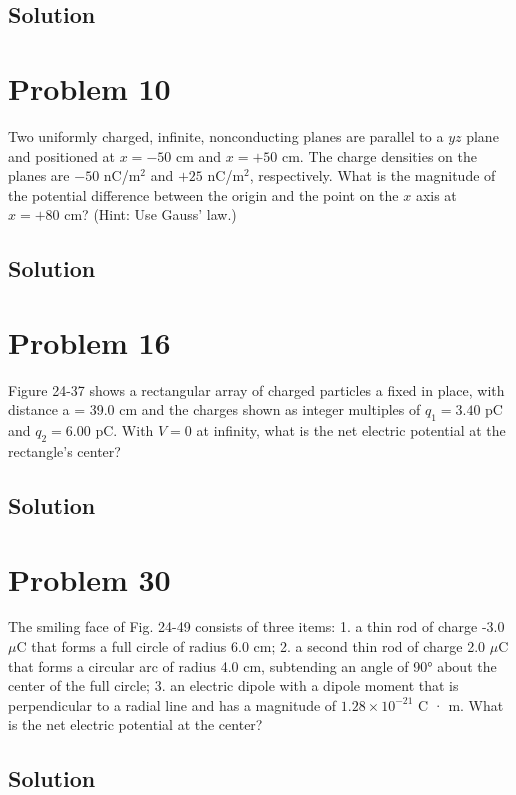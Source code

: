\documentclass{article}
\begin{document}
\subsection*{Solution}

\section*{Problem 10}
Two uniformly charged, infinite, nonconducting planes are parallel to a $yz$ plane and positioned at $x = -50$ cm and $x = +50$ cm. The charge densities on the planes are $-50$ nC/m$^2$ and $+25$ nC/m$^2$, respectively. What is the magnitude of the potential difference between the origin and the point on the $x$ axis at $x = +80$ cm? (Hint: Use Gauss' law.)

\subsection*{Solution}

\section*{Problem 16}
Figure 24-37 shows a rectangular array of charged particles a fixed in place, with distance a = 39.0 cm and the charges shown as integer multiples of $q_1 = 3.40$ pC and $q_2 = 6.00$ pC. With $V = 0$ at infinity, what is the net electric potential at the rectangle's center?

\subsection*{Solution}

\section*{Problem 30}
The smiling face of Fig. 24-49 consists of three items:
1. a thin rod of charge -3.0 $\mu$C that forms a full circle of radius 6.0 cm;
2. a second thin rod of charge 2.0 $\mu$C that forms a circular arc of radius 4.0 cm, subtending an angle of 90° about the center of the full circle;
3. an electric dipole with a dipole moment that is perpendi­cular to a radial line and has a magnitude of $1.28 \times 10^{-21}$ C · m.
What is the net electric potential at the center?

\subsection*{Solution}
\end{document}
